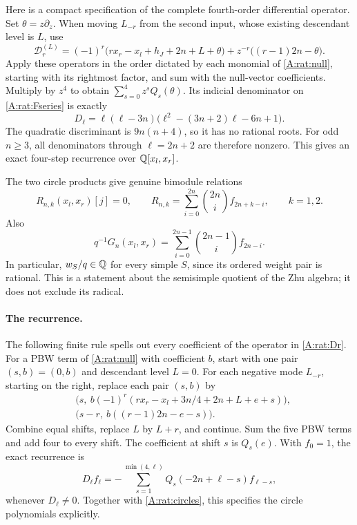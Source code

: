 \documentclass[11pt]{article}
\numberwithin{equation}{section}
\begin{document}
Here is a compact specification of the complete fourth-order differential operator. Set $\theta=z\partial_z$. When moving $L_{-r}$ from the second input, whose existing descendant level is $L$, use
\begin{equation}\label{A:rat:Dr}
 \mathscr D_r^{(L)}=
 (-1)^r\big(rx_r-x_l+h_J+2n+L+\theta\big)
 +z^{-r}\big((r-1)2n-\theta\big).
\end{equation}
Apply these operators in the order dictated by each monomial of \eqref{A:rat:null}, starting with its rightmost factor, and sum with the null-vector coefficients. Multiply by $z^4$ to obtain
$\sum_{s=0}^{4}z^sQ_s(\theta)$. Its indicial denominator on \eqref{A:rat:Fseries} is exactly
\begin{equation}\label{A:rat:indicial}
 D_\ell=\ell(\ell-3n)
      \bigl(\ell^2-(3n+2)\ell-6n+1\bigr).
\end{equation}
The quadratic discriminant is $9n(n+4)$, so it has no rational roots. For odd $n\geq3$, all denominators through $\ell=2n+2$ are therefore nonzero. This gives an exact four-step recurrence over $\mathbb Q[x_l,x_r]$.

The two circle products give genuine bimodule relations
\begin{equation}\label{A:rat:circles}
 R_{n,k}(x_l,x_r)[j]=0,\qquad
 R_{n,k}=\sum_{i=0}^{2n}\binom{2n}{i}f_{2n+k-i},\qquad k=1,2.
\end{equation}
Also
\[
 q^{-1}G_n(x_l,x_r)=\sum_{i=0}^{2n-1}\binom{2n-1}{i}f_{2n-i}.
\]
In particular, $w_S/q\in\mathbb Q$ for every simple $S$, since its ordered weight pair is rational. This is a statement about the semisimple quotient of the Zhu algebra; it does not exclude its radical.

\paragraph{The recurrence.}
The following finite rule spells out every coefficient of the operator in \eqref{A:rat:Dr}. For a PBW term of \eqref{A:rat:null} with coefficient $b$, start with one pair $(s,b)=(0,b)$ and descendant level $L=0$. For each negative mode $L_{-r}$, starting on the right, replace each pair $(s,b)$ by
\[
\begin{split}
&\bigl(s,\ b(-1)^r(rx_r-x_l+3n/4+2n+L+e+s)\bigr),\\
&\bigl(s-r,\ b((r-1)2n-e-s)\bigr).
\end{split}
\]
Combine equal shifts, replace $L$ by $L+r$, and continue. Sum the five PBW terms and add four to every shift. The coefficient at shift $s$ is $Q_s(e)$. With $f_0=1$, the exact recurrence is
\[
D_\ell f_\ell=-\sum_{s=1}^{\min(4,\ell)}Q_s(-2n+\ell-s)f_{\ell-s},
\]
whenever $D_\ell\ne0$. Together with \eqref{A:rat:circles}, this specifies the circle polynomials explicitly.
\end{document}
